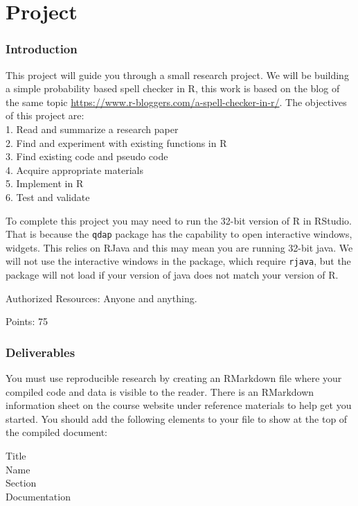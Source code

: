 \documentclass[]{book}
\theoremstyle{definition}
\theoremstyle{definition}
\theoremstyle{definition}
\theoremstyle{remark}
\begin{document}
\chapter{Project}\label{AppB}

\subsection{Introduction}\label{introduction-6}

This project will guide you through a small research project. We will be
building a simple probability based spell checker in R, this work is
based on the blog of the same topic
\url{https://www.r-bloggers.com/a-spell-checker-in-r/}. The objectives
of this project are:\\
1. Read and summarize a research paper\\
2. Find and experiment with existing functions in R\\
3. Find existing code and pseudo code\\
4. Acquire appropriate materials\\
5. Implement in R\\
6. Test and validate

To complete this project you may need to run the 32-bit version of R in
RStudio. That is because the \texttt{qdap} package has the capability to
open interactive windows, widgets. This relies on RJava and this may
mean you are running 32-bit java. We will not use the interactive
windows in the package, which require \texttt{rjava}, but the package
will not load if your version of java does not match your version of R.

Authorized Resources: Anyone and anything.

Points: 75

\subsection{Deliverables}\label{deliverables}

You must use reproducible research by creating an RMarkdown file where
your compiled code and data is visible to the reader. There is an
RMarkdown information sheet on the course website under reference
materials to help get you started. You should add the following elements
to your file to show at the top of the compiled document:

Title\\
Name\\
Section\\
Documentation
\end{document}
